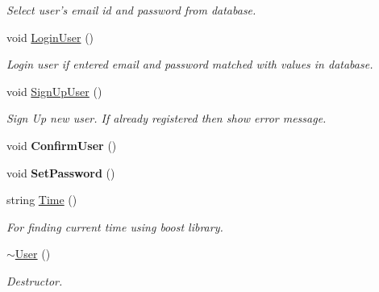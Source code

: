 \begin{DoxyCompactItemize}
\begin{DoxyCompactList}\small\item\em Select user's email id and password from database. \end{DoxyCompactList}\item 
void \hyperlink{classUser_a2e2afafdfe57243dd1630929a7330eed}{Login\-User} ()
\begin{DoxyCompactList}\small\item\em Login user if entered email and password matched with values in database. \end{DoxyCompactList}\item 
\hypertarget{classUser_a0dd495ab60da51562417af1e25a908e6}{void \hyperlink{classUser_a0dd495ab60da51562417af1e25a908e6}{Sign\-Up\-User} ()}\label{classUser_a0dd495ab60da51562417af1e25a908e6}

\begin{DoxyCompactList}\small\item\em Sign Up new user. If already registered then show error message. \end{DoxyCompactList}\item 
\hypertarget{classUser_a7b598815d373361826b3968f10622fd0}{void {\bfseries Confirm\-User} ()}\label{classUser_a7b598815d373361826b3968f10622fd0}

\item 
\hypertarget{classUser_a7abd8164db373138d9573ef70e76a216}{void {\bfseries Set\-Password} ()}\label{classUser_a7abd8164db373138d9573ef70e76a216}

\item 
\hypertarget{classUser_a88cd19968cf44fd38bbb24cf73430603}{string \hyperlink{classUser_a88cd19968cf44fd38bbb24cf73430603}{Time} ()}\label{classUser_a88cd19968cf44fd38bbb24cf73430603}

\begin{DoxyCompactList}\small\item\em For finding current time using boost library. \end{DoxyCompactList}\item 
\hypertarget{classUser_ac00b72ad64eb4149f7b21b9f5468c2b2}{\hyperlink{classUser_ac00b72ad64eb4149f7b21b9f5468c2b2}{$\sim$\-User} ()}\label{classUser_ac00b72ad64eb4149f7b21b9f5468c2b2}

\begin{DoxyCompactList}\small\item\em Destructor. \end{DoxyCompactList}\end{DoxyCompactItemize}
